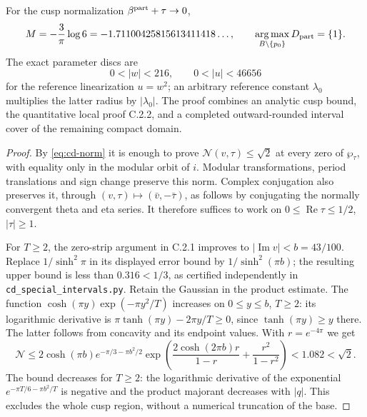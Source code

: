 \begin{theorem}\label{st:C.2.3}
For the cusp normalization $\beta^{\rm part}+\tau\to0$,
\[
 M=-\frac3\pi\log6=-1.71100425815613411418\ldots,
 \qquad \operatorname*{arg\,max}_{B\setminus\{p_0\}}D_{\rm part}=\{1\}.
\]
The exact parameter discs are
\[
 0<|w|<216,
 \qquad 0<|u|<46656
\]
for the reference linearization $u=w^2$; an arbitrary reference constant
$\lambda_0$ multiplies the latter radius by $|\lambda_0|$.
The proof combines an analytic cusp bound, the quantitative local proof
C.2.2, and a completed outward-rounded interval cover of the remaining
compact domain.
\end{theorem}
\begin{proof}
By \eqref{eq:cd-norm} it is enough to prove
$\mathcal N(v,\tau)\leq\sqrt2$ at every zero of $\wp_\tau$, with equality
only in the modular orbit of $i$. Modular transformations, period
translations and sign change preserve this norm. Complex conjugation
also preserves it, through
$(v,\tau)\mapsto(\bar v,-\bar\tau)$, as follows by conjugating the
normally convergent theta and eta series. It therefore suffices to work
on $0\leq\operatorname{Re}\tau\leq1/2$, $|\tau|\geq1$.

For $T\geq2$, the zero-strip argument in C.2.1 improves to
$|\operatorname{Im}v|<b=43/100$. Replace $1/\sinh^2\pi$ in its displayed
error bound by $1/\sinh^2(\pi b)$; the resulting upper bound is less
than $0.316<1/3$, as certified independently in
\texttt{cd\_special\_intervals.py}. Retain the Gaussian in the product
estimate. The function
$\cosh(\pi y)\exp(-\pi y^2/T)$ increases on $0\leq y\leq b$, $T\geq2$:
its logarithmic derivative is $\pi\tanh(\pi y)-2\pi y/T\geq0$, since
$\tanh(\pi y)\geq y$ there. The latter follows from concavity and its
endpoint values. With $r=e^{-4\pi}$ we get
\[
 \mathcal N\leq
 2\cosh(\pi b)e^{-\pi/3-\pi b^2/2}
 \exp\left(\frac{2\cosh(2\pi b)r}{1-r}+
                  \frac{r^2}{1-r^2}\right)
 <1.082<\sqrt2.
\]
The bound decreases for $T\geq2$: the logarithmic derivative of the
exponential $e^{-\pi T/6-\pi b^2/T}$ is negative and the product
majorant decreases with $|q|$. This excludes the whole cusp region,
without a numerical truncation of the base.


\end{proof}
